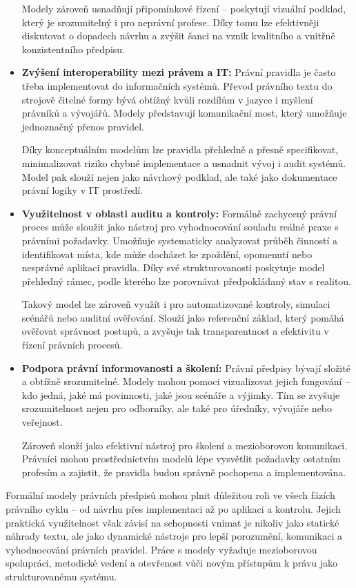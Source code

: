 \begin{itemize}
  Modely zároveň usnadňují připomínkové řízení – poskytují vizuální podklad, který je srozumitelný i pro neprávní profese. Díky tomu lze efektivněji diskutovat o dopadech návrhu a zvýšit šanci na vznik kvalitního a vnitřně konzistentního předpisu.

  \item \textbf{Zvýšení interoperability mezi právem a IT:} Právní pravidla je často třeba implementovat do informačních systémů. Převod právního textu do strojově čitelné formy bývá obtížný kvůli rozdílům v jazyce i myšlení právníků a vývojářů. Modely představují komunikační most, který umožňuje jednoznačný přenos pravidel.

  Díky konceptuálním modelům lze pravidla přehledně a přesně specifikovat, minimalizovat riziko chybné implementace a usnadnit vývoj i audit systémů. Model pak slouží nejen jako návrhový podklad, ale také jako dokumentace právní logiky v IT prostředí.

  \item \textbf{Využitelnost v oblasti auditu a kontroly:} Formálně zachycený právní proces může sloužit jako nástroj pro vyhodnocování souladu reálné praxe s právními požadavky. Umožňuje systematicky analyzovat průběh činností a identifikovat místa, kde může docházet ke zpoždění, opomenutí nebo nesprávné aplikaci pravidla. Díky své strukturovanosti poskytuje model přehledný rámec, podle kterého lze porovnávat předpokládaný stav s realitou.

  Takový model lze zároveň využít i pro automatizované kontroly, simulaci scénářů nebo auditní ověřování. Slouží jako referenční základ, který pomáhá ověřovat správnost postupů, a zvyšuje tak transparentnost a efektivitu v řízení právních  procesů.

  \item \textbf{Podpora právní informovanosti a školení:} Právní předpisy bývají složité a obtížně srozumitelné. Modely mohou pomoci vizualizovat jejich fungování – kdo jedná, jaké má povinnosti, jaké jsou scénáře a výjimky. Tím se zvyšuje srozumitelnost nejen pro odborníky, ale také pro úředníky, vývojáře nebo veřejnost.

  Zároveň slouží jako efektivní nástroj pro školení a mezioborovou komunikaci. Právníci mohou prostřednictvím modelů lépe vysvětlit požadavky ostatním profesím a zajistit, že pravidla budou správně pochopena a implementována.

\end{itemize}

\noindent Formální modely právních předpisů mohou plnit důležitou roli ve všech fázích právního cyklu – od návrhu přes implementaci až po aplikaci a kontrolu. Jejich praktická využitelnost však závisí na schopnosti vnímat je nikoliv jako statické náhrady textu, ale jako dynamické nástroje pro lepší porozumění, komunikaci a vyhodnocování právních pravidel. Práce s modely vyžaduje mezioborovou spolupráci, metodické vedení a otevřenost vůči novým přístupům k právu jako strukturovanému systému.

